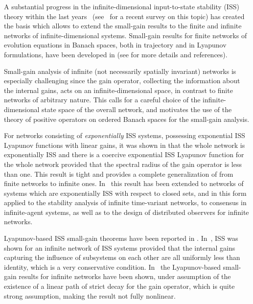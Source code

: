 \documentclass[twocolumn]{IEEEtran} %
\theoremstyle{definition}
\begin{document}
A substantial progress in the infinite-dimensional input-to-state stability (ISS) theory within the last years~\cite{JNP18,JSZ17,KaK16b,KaK19,MiW18b,TPT17,ZhZ18} (see~\cite{MiP20} for a recent survey on this topic) has created the basis which allows to extend the small-gain results to the finite and infinite networks of infinite-dimensional systems.
Small-gain results for finite networks of evolution equations in Banach spaces, both in trajectory and in Lyapunov formulations, have been developed in \cite{BLJ18,Mir19b,MiI15b,TWJ12,KaK18,KaK19b} (see \cite{Mir19b} for more details and references).

Small-gain analysis of infinite (not necessarily spatially invariant) networks is especially challenging since the gain operator, collecting the information about the internal gains, acts on an infinite-dimensional space, in contrast to finite networks of arbitrary nature. This calls for a careful choice of the infinite-dimensional state space of the overall network, and motivates the use of the theory of positive operators on ordered Banach spaces for the small-gain analysis.%

For networks consisting of \emph{exponentially} ISS systems, possessing exponential ISS Lyapunov functions with linear gains, it was shown in \cite{KMS19} that the whole network is exponentially ISS and there is a coercive exponential ISS Lyapunov function for the whole network  provided that the spectral radius of the gain operator is less than one. This result is tight and provides a complete generalization of \cite[Prop.~3.3]{DIW11} from finite networks to infinite ones. In~\cite{NMK20b} this result has been extended to networks of systems which are exponentially ISS with respect to closed sets, and in this form applied to the stability analysis of infinite time-variant networks, to consensus in infinite-agent systems, as well as to the design of distributed observers for infinite networks.%

Lyapunov-based ISS small-gain theorems have been reported in \cite{DaP19,DMS19a}.
In~\cite{DaP19}, ISS was shown for an infinite network of ISS systems provided that the internal gains capturing the influence of subsystems on each other are all uniformly less than identity, which is a very conservative condition. In~\cite{DMS19a} the Lyapunov-based small-gain results for infinite networks have been shown, under assumption of the existence of a linear path of strict decay for the gain operator, which is quite strong assumption, making the result not fully nonlinear.
\end{document}
